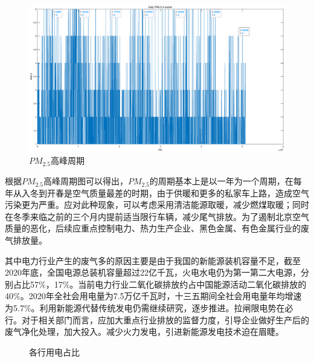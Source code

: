 \documentclass[UTF8]{ctexart}
\begin{document}
\begin{figure}[H] %
    \centering %
    \includegraphics[width=1\textwidth]{./picture/TimeRule.eps} %
    \caption{$PM_{2.5}$高峰周期} 
\end{figure}
根据$PM_{2.5}$高峰周期图可以得出，$PM_{2.5}$的周期基本上是以一年为一个周期，在每年从入冬到开春是空气质量最差的时期，由于供暖和更多的私家车上路，造成空气污染更为严重。应对此种现象，可以考虑采用清洁能源取暖，减少燃煤取暖；同时在冬季来临之前的三个月内提前适当限行车辆，减少尾气排放。为了遏制北京空气质量的恶化，后续应重点控制电力、热力生产企业、黑色金属、有色金属行业的废气排放量。

其中电力行业产生的废气多的原因主要是由于我国的新能源装机容量不足，截至2020年底，全国电源总装机容量超过22亿千瓦，火电水电仍为第一第二大电源，分别占比57\%，17\%。当前电力行业二氧化碳排放约占中国能源活动二氧化碳排放的40\%。2020年全社会用电量为7.5万亿千瓦时，十三五期间全社会用电量年均增速为5.7\%。利用新能源代替传统发电仍需继续研究，逐步推进。拉闸限电势在必行。对于相关部门而言，应加大重点行业排放的监督力度，引导企业做好生产后的废气净化处理，加大投入。减少火力发电，引进新能源发电技术迫在眉睫。
\begin{figure}[H]
    \centering
{}
\caption{各行用电占比}
\end{figure}
\end{document}
